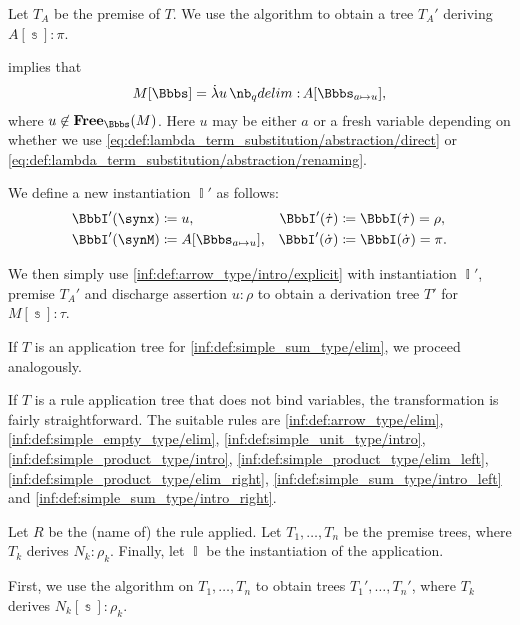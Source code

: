 \begin{algorithm}
\begin{thmenum}
    Let \( T_A \) be the premise of \( T \). We use the algorithm to obtain a tree \( T_A' \) deriving \( A[\Bbbs]: \pi \).

     implies that
    \begin{equation*}
      M[\Bbbs] = \qabs u A[\Bbbs_{a \mapsto u}],
    \end{equation*}
    where \( u \not\in \op*{Free}_\Bbbs(M) \). Here \( u \) may be either \( a \) or a fresh variable depending on whether we use \eqref{eq:def:lambda_term_substitution/abstraction/direct} or \eqref{eq:def:lambda_term_substitution/abstraction/renaming}.

    We define a new instantiation \( \BbbI' \) as follows:
    \begin{align*}
      \BbbI'(\synx) &\coloneqq u,                      &\BbbI'(\syn\tau) &\coloneqq \BbbI(\syn\tau) = \rho, \\
      \BbbI'(\synM) &\coloneqq A[\Bbbs_{a \mapsto u}], &\BbbI'(\syn\sigma) &\coloneqq \BbbI(\syn\sigma) = \pi.
    \end{align*}

    We then simply use \ref{inf:def:arrow_type/intro/explicit} with instantiation \( \BbbI' \), premise \( T_A' \) and discharge assertion \( u: \rho \) to obtain a derivation tree \( T' \) for \( M[\Bbbs]: \tau \).

     If \( T \) is an application tree for \ref{inf:def:simple_sum_type/elim}, we proceed analogously.

     If \( T \) is a rule application tree that does not bind variables, the transformation is fairly straightforward. The suitable rules are \ref{inf:def:arrow_type/elim}, \ref{inf:def:simple_empty_type/elim}, \ref{inf:def:simple_unit_type/intro}, \ref{inf:def:simple_product_type/intro}, \ref{inf:def:simple_product_type/elim_left}, \ref{inf:def:simple_product_type/elim_right}, \ref{inf:def:simple_sum_type/intro_left} and \ref{inf:def:simple_sum_type/intro_right}.

    Let \( R \) be the (name of) the rule applied. Let \( T_1, \ldots, T_n \) be the premise trees, where \( T_k \) derives \( N_k: \rho_k \). Finally, let \( \BbbI \) be the instantiation of the application.

    First, we use the algorithm on \( T_1, \ldots, T_n \) to obtain trees \( T_1', \ldots, T_n' \), where \( T_k \) derives \( N_k[\Bbbs]: \rho_k \).


\end{thmenum}
\end{algorithm}
